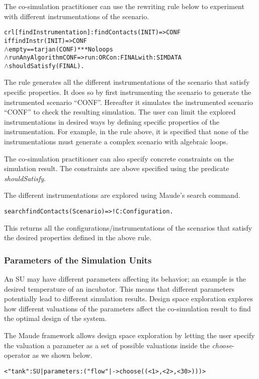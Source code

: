 The co-simulation practitioner can use the rewriting rule below to experiment with different instrumentations of the scenario.

\begin{alltt}
  \small
  crl [findInstrumentation]: findContacts(INIT) => CONF
      if findInstr(INIT) => CONF
      \(\land\) empty == tarjan(CONF) *** No loops
      \(\land\) runAnyAlgorithm CONF => run: ORC on: FINAL with: SIMDATA
      \(\land\) shouldSatisfy(FINAL) .
  \end{alltt}

The rule generates all the different instrumentations of the scenario that satisfy specific properties.
It does so by first instrumenting the scenario to generate the instrumented scenario ``CONF''.
Hereafter it simulates the instrumented scenario ``CONF'' to check the resulting simulation.
The user can limit the explored instrumentations in desired ways by defining specific properties of the instrumentation.
For example, in the rule above, it is specified that none of the instrumentations must generate a complex scenario with algebraic loops.

The co-simulation practitioner can also specify concrete constraints on the simulation result.
The constraints are above specified using the predicate \emph{shouldSatisfy}.

The different instrumentations are explored using Maude's search command.

\begin{alltt}
  \small
  search findContacts(Scenario) =>! C:Configuration .
\end{alltt}
  
This returns all the configurations/instrumentations of the scenarios that satisfy the desired properties defined in the above rule.

\subsubsection{Parameters of the Simulation Units}
An SU may have different parameters affecting its behavior; an example is the desired temperature of an incubator.
This means that different parameters potentially lead to different simulation results.
Design space exploration explores how different valuations of the parameters affect the co-simulation result to find the optimal design of the system. 

The Maude framework allows design space exploration by letting the user specify the valuation a parameter as a set of possible valuations inside the \emph{choose}-operator as we shown below.
\begin{alltt}
  \small
< "tank" : SU | parameters : ("flow" |-> choose((< 1 >,< 2 >,< 30 >))) >
\end{alltt}

